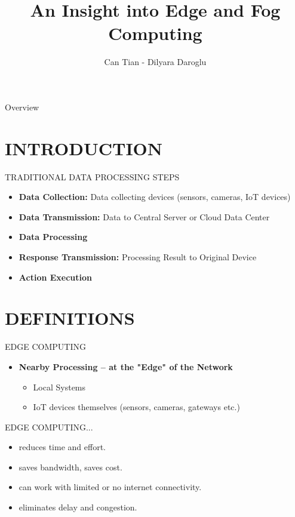 \documentclass[aspectratio=169,xcolor=dvipsnames]{beamer}
\title{An Insight into Edge and Fog Computing}
\author{Can Tian - Dilyara Daroglu}
\institute
{
    Wissenschaftl. Arbeitstechniken u. Präsentation \\
    Paris Lodron University of Salzburg 
}
\date{}
\begin{document}
\begin{frame}
    \titlepage
\end{frame}

\begin{frame}{Overview}
    \tableofcontents
\end{frame}

\section{INTRODUCTION}

\begin{frame}{TRADITIONAL DATA PROCESSING STEPS}
    \begin{itemize}
        \item \textbf{Data Collection:} Data collecting devices (sensors, cameras, IoT
devices)
        \item \textbf{Data Transmission:} Data to Central Server or Cloud Data Center
        \item \textbf{Data Processing}
        \item \textbf{Response Transmission:} Processing Result to Original Device
        \item \textbf{Action Execution}
    \end{itemize}
\end{frame}


\section{DEFINITIONS}

\begin{frame}{EDGE COMPUTING}
    \begin{itemize}
        \item \textbf{Nearby Processing – at the
"Edge" of the Network}
        \begin{itemize}
            \item Local Systems
            \item IoT devices themselves (sensors,
            cameras, gateways etc.)
        \end{itemize}
    \end{itemize}
\end{frame}
\begin{frame}{EDGE COMPUTING...}
    \begin{itemize}
        \item reduces time and effort.
        \item saves bandwidth, saves cost.
        \item can work with limited or no internet connectivity.
        \item eliminates delay and congestion.
    \end{itemize}
\end{frame}
\end{document}
